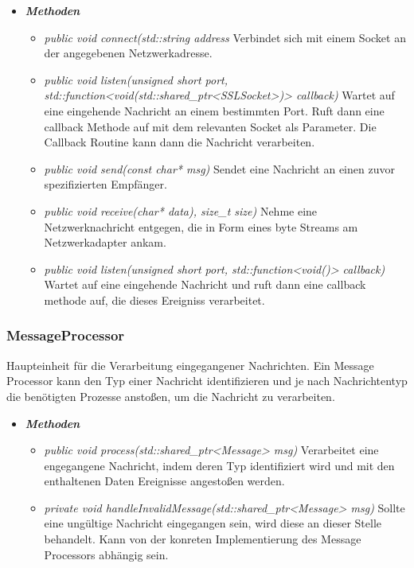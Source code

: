 \documentclass[a4paper,12pt]{article}
\begin{document}
	\begin{itemize}[label={}]

	\item\textit{\textbf{Methoden}}
		\begin{itemize}[label={\textbullet}]
			\item\textit{public void connect(std::string address} Verbindet sich mit einem Socket an der angegebenen Netzwerkadresse.
			\item\textit{public void listen(unsigned short port, std::function<void(std::shared\_ptr<SSLSocket>)> callback)} Wartet auf eine eingehende Nachricht an einem bestimmten Port. Ruft dann eine callback Methode auf mit dem relevanten Socket als Parameter. Die Callback Routine kann dann die Nachricht verarbeiten.
			\item\textit{public void send(const char* msg)} Sendet eine Nachricht an einen zuvor spezifizierten Empfänger.
			\item\textit{public void receive(char* data), size\_t size)} Nehme eine Netzwerknachricht entgegen, die in Form eines byte Streams am Netzwerkadapter ankam.
			\item\textit{public void listen(unsigned short port, std::function<void()> callback)} Wartet auf eine eingehende Nachricht und ruft dann eine callback methode auf, die dieses Ereigniss verarbeitet.

		\end{itemize}

\end{itemize}


\subsubsection{MessageProcessor}

Haupteinheit für die Verarbeitung eingegangener Nachrichten. Ein Message Processor kann den Typ einer Nachricht identifizieren und je nach Nachrichtentyp die benötigten Prozesse anstoßen, um die Nachricht zu verarbeiten.

	\begin{itemize}[label={}]

	\item\textit{\textbf{Methoden}}
		\begin{itemize}[label={\textbullet}]
			\item\textit{public void process(std::shared\_ptr<Message> msg)} Verarbeitet eine engegangene Nachricht, indem deren Typ identifiziert wird und mit den enthaltenen Daten Ereignisse angestoßen werden.
			\item\textit{private void handleInvalidMessage(std::shared\_ptr<Message> msg)} Sollte eine ungültige Nachricht eingegangen sein, wird diese an dieser Stelle behandelt. Kann von der konreten Implementierung des Message Processors abhängig sein.

		\end{itemize}

\end{itemize}
\end{document}
